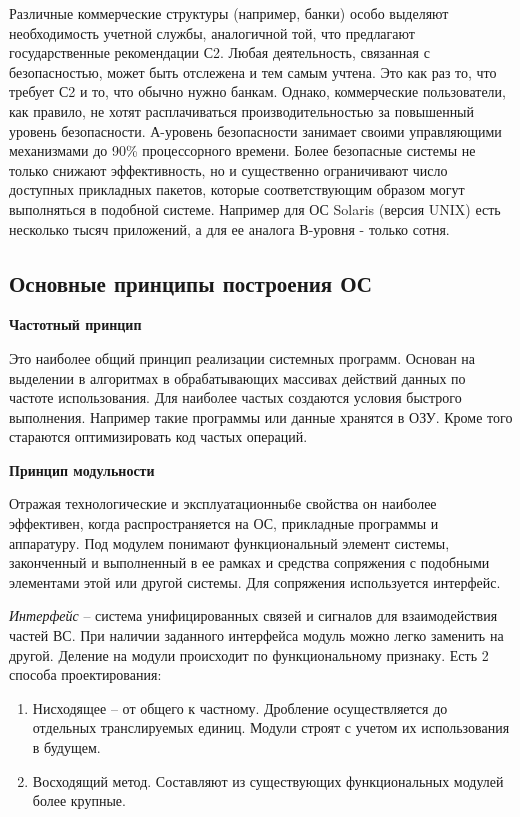 Различные коммерческие структуры (например, банки) особо выделяют необходимость учетной службы, аналогичной той, что предлагают государственные рекомендации С2. Любая деятельность, связанная с безопасностью, может быть отслежена и тем самым учтена. Это как раз то, что требует С2 и то, что обычно нужно банкам. Однако, коммерческие пользователи, как правило, не хотят расплачиваться производительностью за повышенный уровень безопасности. А-уровень безопасности занимает своими управляющими механизмами до 90\% процессорного времени. Более безопасные системы не только снижают эффективность, но и существенно ограничивают число доступных прикладных пакетов, которые соответствующим образом могут выполняться в подобной системе. Например для ОС Solaris (версия UNIX) есть несколько тысяч приложений, а для ее аналога В-уровня - только сотня.
\subsection{Основные принципы построения ОС}
\textbf{Частотный принцип}

Это наиболее общий принцип реализации системных программ. Основан на выделении в алгоритмах в обрабатывающих массивах действий данных по частоте использования. Для наиболее частых создаются условия быстрого выполнения. Например такие программы или данные хранятся в ОЗУ. Кроме того стараются оптимизировать код частых операций.
\newline

\textbf{Принцип модульности}

Отражая технологические и эксплуатационны6е свойства он наиболее эффективен, когда распространяется на ОС, прикладные программы и аппаратуру. Под модулем понимают функциональный элемент системы, законченный и выполненный в ее рамках и средства сопряжения с подобными элементами этой или другой системы. Для сопряжения используется интерфейс.

\begin{opr}\textit{Интерфейс} – система унифицированных связей и сигналов для взаимодействия частей ВС. При наличии заданного интерфейса модуль можно легко заменить на другой. Деление на модули происходит по функциональному признаку. Есть 2 способа проектирования:
\end{opr}
\begin{enumerate}
   \item Нисходящее – от общего к частному.
         Дробление осуществляется до отдельных транслируемых единиц. Модули строят с учетом их использования в будущем.
   \item Восходящий метод. Составляют из существующих функциональных модулей более крупные.
\end{enumerate}

